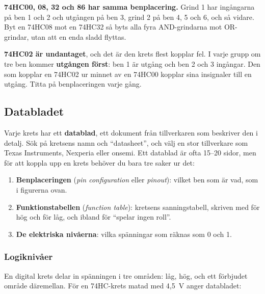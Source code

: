 


\textbf{74HC00, 08, 32 och 86 har samma benplacering.} Grind 1 har ingångarna på ben 1 och 2 och
utgången på ben 3, grind 2 på ben 4, 5 och 6, och så vidare. Byt en 74HC08 mot en 74HC32 så byts
alla fyra AND-grindarna mot OR-grindar, utan att en enda sladd flyttas.

\textbf{74HC02 är undantaget}, och det är den krets flest kopplar fel. I varje grupp om tre ben
kommer \textbf{utgången först}: ben 1 är utgång och ben 2 och 3 ingångar. Den som kopplar en 74HC02
ur minnet av en 74HC00 kopplar sina insignaler till en utgång. Titta på benplaceringen varje gång.

\subsection{Databladet}
\label{c4:b3}
Varje krets har ett \textbf{datablad}, ett dokument från tillverkaren som beskriver den i detalj.
Sök på kretsens namn och \enquote{datasheet}, och välj en stor tillverkare som Texas Instruments,
Nexperia eller onsemi. Ett datablad är ofta 15--20 sidor, men för att koppla upp en krets behöver
du bara tre saker ur det:
\begin{enumerate}
  \item \textbf{Benplaceringen} (\emph{pin configuration} eller \emph{pinout}): vilket ben som är
    vad, som i figurerna ovan.
  \item \textbf{Funktionstabellen} (\emph{function table}): kretsens sanningstabell, skriven med
     för hög och  för låg, och ibland  för \enquote{spelar ingen roll}.
  \item \textbf{De elektriska nivåerna}: vilka spänningar som räknas som 0 och 1.
\end{enumerate}

\subsubsection{Logiknivåer}
En digital krets delar in spänningen i tre områden: låg, hög, och ett förbjudet område däremellan.
För en 74HC-krets matad med 4,5~V anger databladet:

